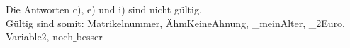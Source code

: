 Die Antworten c), e) und i) sind nicht gültig.\\Gültig sind somit: Matrikelnummer, ÄhmKeineAhnung, {\_}meinAlter, {\_}2Euro, Variable2, noch$\_$besser